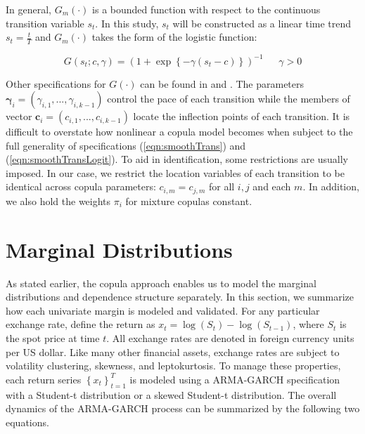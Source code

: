 \documentclass[12pt]{article}
\begin{document}
In general, $G_{m}\left(\cdot\right)$ is a bounded function with respect to the continuous transition variable $s_{t}$. In this study, $s_{t}$ will be constructed as a linear time trend $s_{t}=\frac{t}{T}$ and $G_{m}\left(\cdot\right)$ takes the form of the logistic function:

\begin{equation} \label{eqn:smoothTransLogit}
	G\left(s_{t}; c, \gamma\right) = \left(1+\exp\left\{ -\gamma \left(s_{t}-c\right) \right\}\right)^{-1}~~~~~~~\gamma > 0
\end{equation}

Other specifications for $G\left( \cdot \right) $ can be found in \cite{Dijk_and_Frances_1999} and \cite{Ocal_and_Osborn_2000}. The parameters $\boldsymbol{\gamma}_{i} = \left(\gamma_{i,1},...,\gamma_{i,k-1}\right)$ control the pace of each transition while the members of vector $\mathbf{c}_{i} = \left(c_{i,1},...,c_{i,k-1}\right)$ locate the inflection points of each transition. It is difficult to overstate how nonlinear a copula model becomes when subject to the full generality of specifications (\ref{eqn:smoothTrans}) and (\ref{eqn:smoothTransLogit}). To aid in identification, some restrictions are usually imposed. In our case, we restrict the location variables of each transition to be identical across copula parameters: $c_{i,m}=c_{j,m}$ for all $i,j$ and each $m$. In addition, we also hold the weights $\pi_{i}$ for mixture copulas constant.

\section{Marginal Distributions} \label{sec:marginal_distributions}

As stated earlier, the copula approach enables us to model the marginal distributions and dependence structure separately. In this section, we summarize how each univariate margin is modeled and validated. For any particular exchange rate, define the return as $x_{t} = \log \left(S_{t}\right) - \log\left(S_{t-1}\right)$, where $S_{t}$ is the spot price at time $t$. All exchange rates are denoted in foreign currency units per US dollar. Like many other financial assets, exchange rates are subject to volatility clustering, skewness, and leptokurtosis. To manage these properties, each return series $\left\{x_{t}\right\}_{t=1}^{T}$ is modeled using a ARMA-GARCH specification with a Student-t distribution or a skewed Student-t distribution. The overall dynamics of the ARMA-GARCH process can be summarized by the following two equations.
\end{document}
